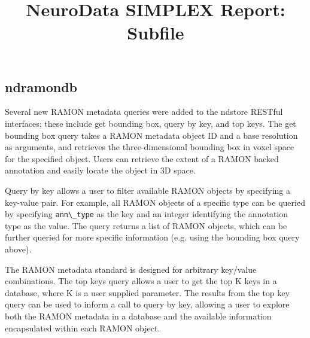 \documentclass[simplex.tex]{subfiles}
\title{NeuroData SIMPLEX Report: Subfile}
\begin{document}

\subsection{ndramondb}

Several new RAMON metadata queries were added to the ndstore RESTful
interfaces; these include get bounding box, query by key, and top keys.
The get bounding box query takes a RAMON metadata object ID and a base
resolution as arguments, and retrieves the three-dimensional bounding
box in voxel space for the specified object. Users can retrieve the
extent of a RAMON backed annotation and easily locate the object in 3D
space. 


Query by key allows a user to filter available RAMON objects by
specifying a key-value pair. For example, all RAMON objects of a
specific type can be queried by specifying \verb+ann\_type+ as the key and
an integer identifying the annotation type as the value. The query
returns a list of RAMON objects, which can be further queried for more
specific information (e.g. using the bounding box query above). 


The RAMON metadata standard is designed for arbitrary key/value
combinations. The top keys query allows a user to get the top K keys in
a database, where K is a user supplied parameter. The results from the
top key query can be used to inform a call to query by key, allowing a
user to explore both the RAMON metadata in a database and the available
information encapsulated within each RAMON object.
\end{document}
